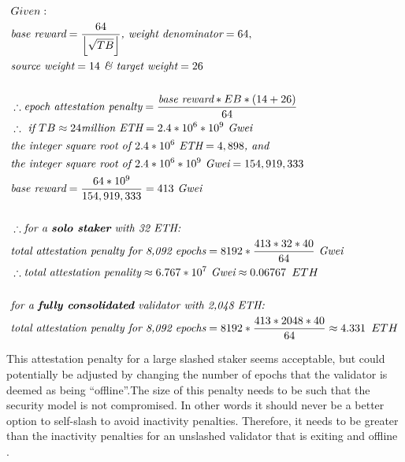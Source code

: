 \documentclass[UTF8]{article}
\begin{document}
\begin{equation*}
\begin{split}
& Given:\\
& \textit{base reward} = \frac{64}{ \left\lfloor \sqrt{TB} \right\rfloor} \textit{, weight denominator} = 64, \\
& \textit{source weight} = 14 \textit{  \& target weight} = 26\\
& \\
& \therefore \textit{epoch attestation penalty} = \frac{\textit{base reward} * EB * (14 + 26)}{64} \\
& \therefore \textit{ if } TB \approx 24 \textit{million ETH} = 2.4 * 10^6 * 10^9 \textit{ Gwei}\\
& \textit{the integer square root of } 2.4 * 10^6 \textit{ ETH} = 4,898 \textit{, and} \\
& \textit{the integer square root of } 2.4 * 10^6 * 10^9 \textit{ Gwei} = 154,919,333 \\
& \textit{base reward} = \frac{64 * 10^9}{154,919,333} = 413 \textit{ Gwei} \\
& \\
& \therefore \textit{for a \textbf{solo staker} with 32 ETH:} \\
& \textit{total attestation penalty for 8,092 epochs} = 8192 * \frac{413*32*40}{64}  \textit{ Gwei}\\
& \therefore \textit{total attestation penality} \approx 6.767 * 10^7 \textit{ Gwei} \approx 0.06767 \texttt{ } ETH \\
& \\
& \textit{for a \textbf{fully consolidated} validator with 2,048 ETH:} \\
& \textit{total attestation penalty for 8,092 epochs} = 8192 * \frac{413*2048*40}{64}\approx 4.331 \texttt{ } ETH \\
\end{split}
\end{equation*}

This attestation penalty for a large slashed staker seems acceptable, but could potentially be adjusted by changing the number of epochs that the validator is deemed as being ``offline''.The size of this penalty needs to be such that the security model is not compromised. In other words it should never be a better option to self-slash to avoid inactivity penalties. Therefore, it needs to be greater than the inactivity penalties for an unslashed validator that is exiting and offline \cite{Neuder2023d}.
\end{document}
